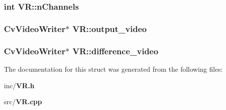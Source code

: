 \subsubsection{\setlength{\rightskip}{0pt plus 5cm}int {\bf VR::nChannels}}\label{structVR_390343e9499b7956504998ff9519908a}


\subsubsection{\setlength{\rightskip}{0pt plus 5cm}CvVideoWriter$\ast$ {\bf VR::output\_\-video}}\label{structVR_c4de68ceaf06a6e4fe94b0adae0c3ca6}


\subsubsection{\setlength{\rightskip}{0pt plus 5cm}CvVideoWriter$\ast$ {\bf VR::difference\_\-video}}\label{structVR_58db704ea1f1450f987947baadfbbff1}




The documentation for this struct was generated from the following files:\begin{CompactItemize}
\item 
inc/{\bf VR.h}\item 
src/{\bf VR.cpp}\end{CompactItemize}
